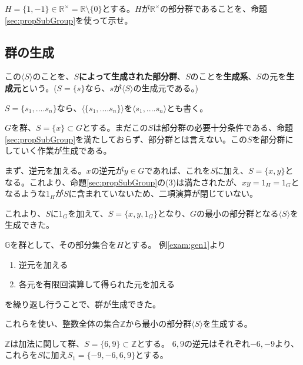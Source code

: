 \documentclass[dvipdfmx,autodetect-engine]{jsarticle}
\begin{document}
\ques $H = \{1, -1\} \in \mathbb{R}^{\times} = \mathbb{R} \setminus \{0\}$とする。$H$が$\mathbb{R}^{\times}$の部分群であることを、命題\ref{sec:propSubGroup}を使って示せ。


\subsection{群の生成}

 この$\langle S \rangle$のことを、{\bf $S$によって生成された部分群}、$S$のことを{\bf 生成系}、$S$の元を{\bf 生成元}という。($S = \{s\}$なら、$s$が$\langle S \rangle$の生成元である。)

$S = \{s_{1}, .... s_{n}  \}$なら、$\langle \{s_{1}, .... s_{n}  \} \rangle$を$\langle s_{1}, .... s_{n} \rangle$とも書く。


$G$を群、$S = \{x\} \subset G$とする。まだこの$S$は部分群の必要十分条件である、命題\ref{sec:propSubGroup}を満たしておらず、部分群とは言えない。この$S$を部分群にしていく作業が生成である。

まず、逆元を加える。$x$の逆元が$y \in G$であれば、これを$S$に加え、$S = \{x, y\}$となる。これより、命題\ref{sec:propSubGroup}の(3)は満たされたが、$x y = 1_{H} = 1_{G}$となるような$1_{H}$が$S$に含まれていないため、二項演算が閉じていない。

これより、$S$に$1_{G}$を加えて、$S=\{x, y, 1_{G}\}$となり、$G$の最小の部分群となる$\langle S \rangle$を生成できた。


$\mathbb{G}$を群として、その部分集合を$H$とする。
例\ref{exam:gen1}より

\begin{enumerate}
\renewcommand{\labelenumi}{(\arabic{enumi})}
\item 逆元を加える
\item 各元を有限回演算して得られた元を加える
\end{enumerate}

を繰り返し行うことで、群が生成できた。

これらを使い、整数全体の集合$\mathbb{Z}$から最小の部分群$\langle S \rangle$を生成する。

$\mathbb{Z}$は加法に関して群、$S = \{6, 9\} \subset \mathbb{Z}$とする。
$6, 9$の逆元はそれぞれ$-6, -9$より、これらを$S$に加え$S_{1} = \{-9, -6, 6, 9\}$とする。
\end{document}
